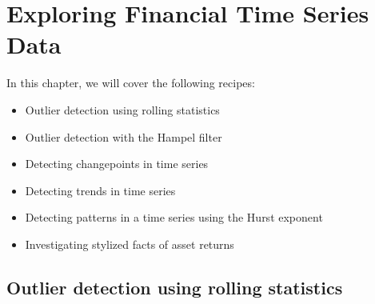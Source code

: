 \chapter{Exploring Financial Time Series Data\label{ch04}}
In this chapter, we will cover the following recipes:
\begin{itemize}
    \item Outlier detection using rolling statistics
    \item Outlier detection with the Hampel filter
    \item Detecting changepoints in time series
    \item Detecting trends in time series
    \item Detecting patterns in a time series using the Hurst exponent
    \item Investigating stylized facts of asset returns
\end{itemize}
\section{Outlier detection using rolling statistics}
